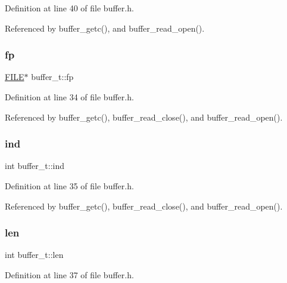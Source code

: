 Definition at line 40 of file buffer.\+h.



Referenced by buffer\+\_\+getc(), and buffer\+\_\+read\+\_\+open().

\mbox{\label{structbuffer__t_a00a55014e0827223c41b1b1d56e5be5d}} 
\subsubsection{\texorpdfstring{fp}{fp}}
{\footnotesize\ttfamily \hyperlink{posix_8h_aed4dabeb9f7c518ded42f930a04abce8}{F\+I\+LE}$\ast$ buffer\+\_\+t\+::fp}



Definition at line 34 of file buffer.\+h.



Referenced by buffer\+\_\+getc(), buffer\+\_\+read\+\_\+close(), and buffer\+\_\+read\+\_\+open().

\mbox{\label{structbuffer__t_a59ea992e5006ead050862bae5c41670a}} 
\subsubsection{\texorpdfstring{ind}{ind}}
{\footnotesize\ttfamily int buffer\+\_\+t\+::ind}



Definition at line 35 of file buffer.\+h.



Referenced by buffer\+\_\+getc(), buffer\+\_\+read\+\_\+close(), and buffer\+\_\+read\+\_\+open().

\mbox{\label{structbuffer__t_a0b67fc6880d331ae05dab0e58a4584c2}} 
\subsubsection{\texorpdfstring{len}{len}}
{\footnotesize\ttfamily int buffer\+\_\+t\+::len}



Definition at line 37 of file buffer.\+h.



